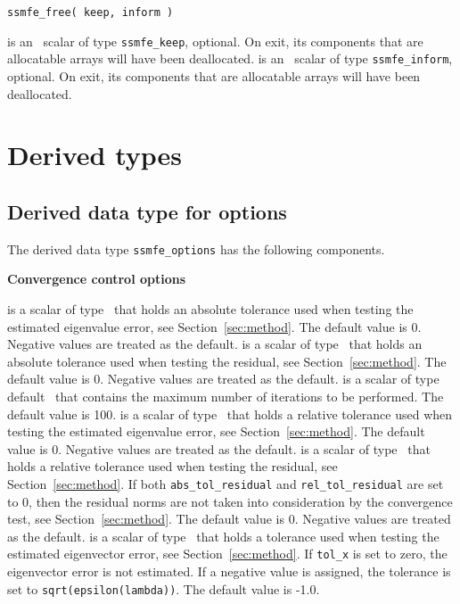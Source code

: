 \medskip

\hspace{8mm} {\tt ssmfe\_free( keep, inform )}

\begin{description}
%
 is an \intentinout\ scalar of type 
{\tt ssmfe\_keep}, optional. 
On exit, its components that are allocatable arrays will have been deallocated. 
%
 is an \intentinout\ scalar of type {\tt ssmfe\_inform}, 
optional.
On exit, its components that are allocatable arrays will have been deallocated. 
%
\end{description}

\section{Derived types}

\subsection{Derived data type for options}

\label{sec:options}

The derived data type
{\tt ssmfe\_options}
has the following components.

\bigskip
\noindent
{\bf Convergence control options}

\begin{description}
%
 is a scalar of type
\REALDP\ that
holds an absolute tolerance used when testing the estimated eigenvalue 
error, see Section~\ref{sec:method}. 
The default value is 0.
Negative values are treated as the default.
%
 is a scalar of type \REALDP\ that
holds an absolute tolerance used when testing the residual, 
see Section~\ref{sec:method}.
The default value is 0.
Negative values are treated as the default.
%
 is a scalar of type default \Integer\ that
contains the maximum number of iterations to be performed.
The default value is 100.
%
 is a scalar of type \REALDP\ that
holds a relative tolerance used when testing the estimated eigenvalue 
error, see Section~\ref{sec:method}. 
The default value is 0. 
Negative values are treated as the default.
%
 is a scalar of type \REALDP\ that
holds a relative tolerance used when testing the residual,
see Section~\ref{sec:method}. 
If both {\tt abs\_tol\_residual} and {\tt rel\_tol\_residual}
are set to 0, then the residual norms are not taken
into consideration by the convergence test,
see Section~\ref{sec:method}.
The default value is 0.
Negative values are treated as the default.
%
 is a scalar of type \REALDP\ that
holds a tolerance used when testing the estimated 
eigenvector error, see Section~\ref{sec:method}. 
If {\tt tol\_x} is set to zero, the eigenvector error is not estimated.
If a negative value is assigned, the tolerance is set to
{\tt sqrt(epsilon(lambda))}.
The default value is -1.0.
%
\end{description}

